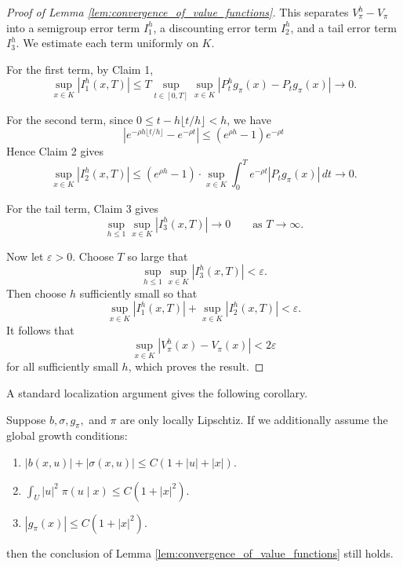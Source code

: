 \begin{proof}[Proof of Lemma \ref{lem:convergence_of_value_functions}]
\noindent This separates $V_\pi^h - V_\pi$ into a semigroup error term $I_1^h$, a discounting error term $I_2^h$, and a tail error term $I_3^h$.
 We estimate each term uniformly on $K$.

For the first term, by Claim 1,
\[
\sup_{x\in K}|I_1^h(x,T)|
\le
T \sup_{t\in[0,T]}\sup_{x\in K}|P_t^h g_\pi(x)-P_t g_\pi(x)|
\to 0.
\]

\noindent For the second term, since $0\le t-h\lfloor t/h\rfloor < h$, we have
\[
|e^{-\rho h\lfloor t/h\rfloor}-e^{-\rho t}|
\le (e^{\rho h} - 1) e^{-\rho t}
\]
 \noindent Hence Claim 2 gives
\[
\sup_{x\in K}|I_2^h(x,T)|
\le
(e^{\rho h} - 1) \cdot \sup_{x\in K} \int_0^T e^{-\rho t}|P_t g_\pi(x)|\,dt
\to 0.
\]

\noindent For the tail term, Claim 3 gives
\[
\sup_{h\le1}\sup_{x\in K}|I_3^h(x,T)|\to 0
\qquad \text{as } T\to\infty.
\]

\noindent Now let $\varepsilon>0$. Choose $T$ so large that
\[
\sup_{h\le1}\sup_{x\in K}|I_3^h(x,T)|<\varepsilon.
\]
Then choose $h$ sufficiently small so that
\[
\sup_{x\in K}|I_1^h(x,T)|+\sup_{x\in K}|I_2^h(x,T)|<\varepsilon.
\]
It follows that
\[
\sup_{x\in K}|V_\pi^h(x)-V_\pi(x)|<2\varepsilon
\]
for all sufficiently small $h$, which proves the result.
\end{proof}

\noindent A standard localization argument gives the following corollary.

\begin{corollary}
\label{corr:conv_value_with_local_lipschitz}
	Suppose $b, \sigma, g_\pi,$ and $\pi$ are only locally Lipschtiz. If we additionally
	assume the global growth conditions:

	\begin{enumerate}[label=(\roman*)]
		\item $|b(x,u)| + |\sigma(x,u)| \leq C(1 + |u| + |x|).$
		\item $\int_U |u|^2 \; \pi(u \mid x) \leq C(1+ |x|^2)$.
		\item $|g_\pi(x)| \leq C(1 + |x|^2)$.
	\end{enumerate}
	\noindent then the conclusion of Lemma \ref{lem:convergence_of_value_functions} still holds.
\end{corollary}

